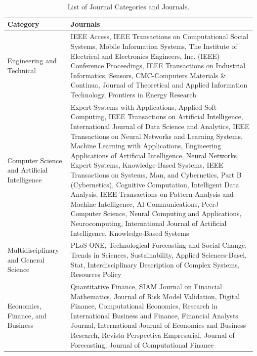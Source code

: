 \begin{table}[H]
    \centering
    \caption[Journal Categories Mapping]{List of Journal Categories and Journals.}
    \label{table:journal_categories}
    \small
    \begin{adjustbox}{width=1\textwidth,center}
    \begin{tabular}{p{} p{}}
        \toprule
        \textbf{Category} & \textbf{Journals} \\
        \midrule
        Engineering and Technical & IEEE Access, IEEE Transactions on Computational Social Systems, Mobile Information Systems, The Institute of Electrical and Electronics Engineers, Inc. (IEEE) Conference Proceedings, IEEE Transactions on Industrial Informatics, Sensors, CMC-Computers Materials \& Continua, Journal of Theoretical and Applied Information Technology, Frontiers in Energy Research \\
        \addlinespace
        \hdashline[0.2pt/3pt]
        \addlinespace
        Computer Science and Artificial Intelligence & Expert Systems with Applications, Applied Soft Computing, IEEE Transactions on Artificial Intelligence, International Journal of Data Science and Analytics, IEEE Transactions on Neural Networks and Learning Systems, Machine Learning with Applications, Engineering Applications of Artificial Intelligence, Neural Networks, Expert Systems, Knowledge-Based Systems, IEEE Transactions on Systems, Man, and Cybernetics, Part B (Cybernetics), Cognitive Computation, Intelligent Data Analysis, IEEE Transactions on Pattern Analysis and Machine Intelligence, AI Communications, PeerJ Computer Science, Neural Computing and Applications, Neurocomputing, International Journal of Artificial Intelligence, Knowledge-Based Systems \\
        \addlinespace
        \hdashline[0.2pt/3pt]
        \addlinespace
        Multidisciplinary and General Science & PLoS ONE, Technological Forecasting and Social Change, Trends in Sciences, Sustainability, Applied Sciences-Basel, Stat, Interdisciplinary Description of Complex Systems, Resources Policy \\
        \addlinespace
        \hdashline[0.2pt/3pt]
        \addlinespace
        Economics, Finance, and Business & Quantitative Finance, SIAM Journal on Financial Mathematics, Journal of Risk Model Validation, Digital Finance, Computational Economics, Research in International Business and Finance, Financial Analysts Journal, International Journal of Economics and Business Research, Revista Perspectiva Empresarial, Journal of Forecasting, Journal of Computational Finance \\

\end{tabular}
\end{adjustbox}
\end{table}
